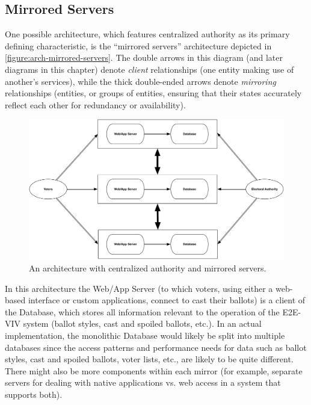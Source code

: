 \subsection{Mirrored Servers}

One possible architecture, which features centralized authority as its
primary defining characteristic, is the ``mirrored servers''
architecture depicted in \autoref{figure:arch-mirrored-servers}. The
double arrows in this diagram (and later diagrams in this chapter)
denote \emph{client} relationships (one entity making use of another's
services), while the thick double-ended arrows denote \emph{mirroring}
relationships (entities, or groups of entities, ensuring that their
states accurately reflect each other for redundancy or availability).

\begin{figure}[t]
\begin{center}
\includegraphics[width=6.5in]{architecture_resources/mirrored-servers.pdf}
\end{center}
\caption{An architecture with centralized authority and mirrored
  servers.}
\label{figure:arch-mirrored-servers}
\end{figure}

In this architecture the Web/App Server (to which voters, using either
a web-based interface or custom applications, connect to cast their
ballots) is a client of the Database, which stores all information
relevant to the operation of the E2E-VIV system (ballot styles, cast
and spoiled ballots, etc.). In an actual implementation, the
monolithic Database would likely be split into multiple databases
since the access patterns and performance needs for data such as
ballot styles, cast and spoiled ballots, voter lists, etc., are likely
to be quite different. There might also be more components within each
mirror (for example, separate servers for dealing with native
applications vs. web access in a system that supports both).

